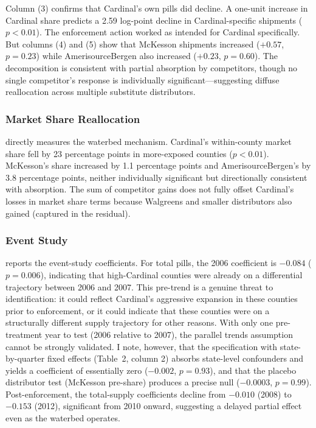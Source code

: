 \documentclass[12pt]{article}
\begin{document}
Column (3) confirms that Cardinal's own pills did decline. A one-unit increase in Cardinal share predicts a 2.59 log-point decline in Cardinal-specific shipments ($p < 0.01$). The enforcement action worked as intended for Cardinal specifically. But columns (4) and (5) show that McKesson shipments increased ($+0.57$, $p = 0.23$) while AmerisourceBergen also increased ($+0.23$, $p = 0.60$). The decomposition is consistent with partial absorption by competitors, though no single competitor's response is individually significant---suggesting diffuse reallocation across multiple substitute distributors.

\subsubsection*{Market Share Reallocation}
 directly measures the waterbed mechanism. Cardinal's within-county market share fell by 23 percentage points in more-exposed counties ($p < 0.01$). McKesson's share increased by 1.1 percentage points and AmerisourceBergen's by 3.8 percentage points, neither individually significant but directionally consistent with absorption. The sum of competitor gains does not fully offset Cardinal's losses in market share terms because Walgreens and smaller distributors also gained (captured in the residual).

\subsubsection*{Event Study}
 reports the event-study coefficients. For total pills, the 2006 coefficient is $-0.084$ ($p = 0.006$), indicating that high-Cardinal counties were already on a differential trajectory between 2006 and 2007. This pre-trend is a genuine threat to identification: it could reflect Cardinal's aggressive expansion in these counties prior to enforcement, or it could indicate that these counties were on a structurally different supply trajectory for other reasons. With only one pre-treatment year to test (2006 relative to 2007), the parallel trends assumption cannot be strongly validated. I note, however, that the specification with state-by-quarter fixed effects (Table~2, column 2) absorbs state-level confounders and yields a coefficient of essentially zero ($-0.002$, $p = 0.93$), and that the placebo distributor test (McKesson pre-share) produces a precise null ($-0.0003$, $p = 0.99$). Post-enforcement, the total-supply coefficients decline from $-0.010$ (2008) to $-0.153$ (2012), significant from 2010 onward, suggesting a delayed partial effect even as the waterbed operates.
\end{document}
